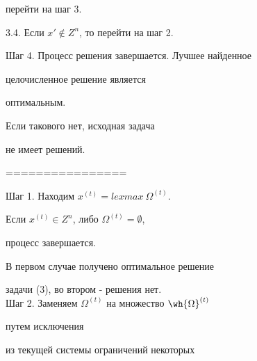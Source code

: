 \hspace{17mm} перейти на шаг 3.





\hspace{10mm} 3.4. Если $x' \not \in Z^{n}$, то перейти на шаг 2.





\noindent{}Шаг 4. Процесс решения завершается. Лучшее найденное





\hspace{10mm} целочисленное решение является


оптимальным.








\hspace{10mm}  Если такового нет, исходная задача


 не имеет решений.





================


 \noindent


 Шаг 1. Находим $x^{(t)} = lexmax \ \Omega^{(t)}$.     





 \hspace{7mm} Если $x^{(t)} \in Z^{n}$, либо $ \Omega^{(t)} = \emptyset$,


 процесс завершается. 





 \hspace{7mm} В первом случае получено оптимальное решение





 \hspace{7mm} задачи (3), во втором - решения нет.\\


 Шаг 2. Заменяем $ \Omega^{(t)}$ на множество $ \wh{ \Omega}^{(t)}$ 


 путем исключения





 \hspace{7mm} из текущей системы  ограничений некоторых





